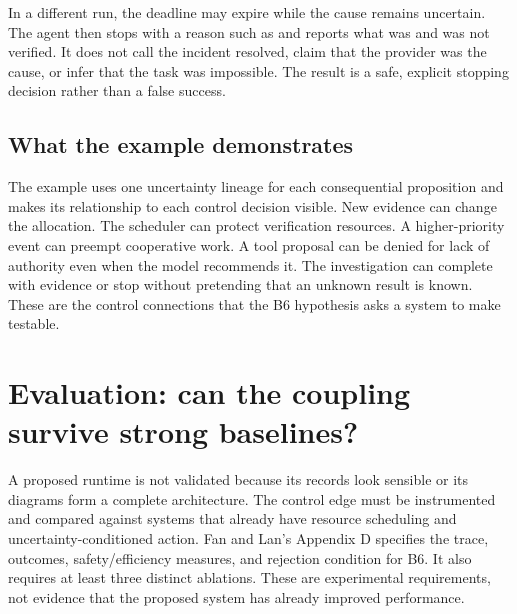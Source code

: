 In a different run, the deadline may expire while the cause remains uncertain. The agent then stops with a reason such as \texttt{} and reports what was and was not verified. It does not call the incident resolved, claim that the provider was the cause, or infer that the task was impossible. The result is a safe, explicit stopping decision rather than a false success.


\subsection{What the example demonstrates}

The example uses one uncertainty lineage for each consequential proposition and makes its relationship to each control decision visible. New evidence can change the allocation. The scheduler can protect verification resources. A higher-priority event can preempt cooperative work. A tool proposal can be denied for lack of authority even when the model recommends it. The investigation can complete with evidence or stop without pretending that an unknown result is known. These are the control connections that the B6 hypothesis asks a system to make testable.

\section{Evaluation: can the coupling survive strong baselines?}
\label{sec:ch16-evaluation}

A proposed runtime is not validated because its records look sensible or its diagrams form a complete architecture. The control edge must be instrumented and compared against systems that already have resource scheduling and uncertainty-conditioned action. Fan and Lan's Appendix D specifies the trace, outcomes, safety/efficiency measures, and rejection condition for B6. It also requires at least three distinct ablations. These are experimental requirements, not evidence that the proposed system has already improved performance.

